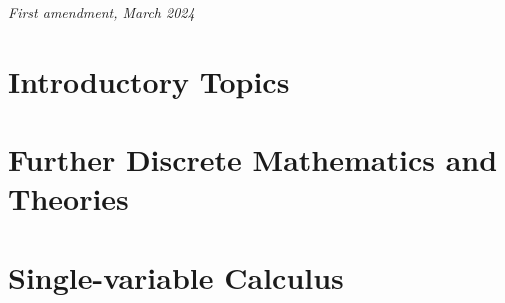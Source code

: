 \documentclass[
	12pt, %
	fleqn, %
	a4paper, %
]{LegrandOrangeBook}
\theoremstyle{lemmastyle}
\theoremstyle{solutionStyle}
\theoremstyle{axiom_style}
\begin{document}
\noindent \textit{First amendment, March 2024} %


\pagestyle{empty} %

\tableofcontents %

\listoffigures %

\listoftables %

\pagestyle{fancy} %

\cleardoublepage %


\part{Introductory Topics}






\part{Further Discrete Mathematics and Theories}






\part{Single-variable Calculus}







\end{document}
